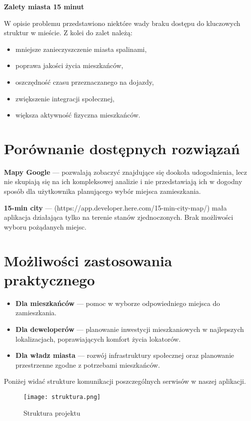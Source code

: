 \documentclass{article}
\begin{document}
\noindent
\textbf{Zalety miasta 15 minut}

W opisie problemu przedstawiono niektóre wady braku dostępu do kluczowych struktur w mieście. Z kolei do zalet należą:

\begin{itemize}
    \item mniejsze zanieczyszczenie miasta spalinami,
    \item poprawa jakości życia mieszkańców,
    \item oszczędność czasu przeznaczanego na dojazdy,
    \item zwiększenie integracji społecznej,
    \item większa aktywność fizyczna mieszkańców.
\end{itemize}

\section{Porównanie dostępnych rozwiązań}

\textbf{Mapy Google} — pozwalają zobaczyć znajdujące się dookoła udogodnienia, lecz nie skupiają się na ich kompleksowej analizie i nie przedstawiają ich w dogodny sposób dla użytkownika planującego wybór miejsca zamieszkania.

\textbf{15-min city} — (https://app.developer.here.com/15-min-city-map/) mała aplikacja działająca tylko na terenie stanów zjednoczonych. Brak możliwości wyboru pożądanych miejsc.

\section{Możliwości zastosowania praktycznego}

\begin{itemize}
    \item \textbf{Dla mieszkańców} — pomoc w wyborze odpowiedniego miejsca do zamieszkania.
    \item \textbf{Dla deweloperów} — planowanie inwestycji mieszkaniowych w najlepszych lokalizacjach, poprawiających komfort życia lokatorów.
    \item \textbf{Dla władz miasta} — rozwój infrastruktury społecznej oraz planowanie przestrzenne zgodne z potrzebami mieszkańców.
\end{itemize}


Poniżej widać strukture komunikacji poszczególnych serwisów w naszej aplikacji.

\begin{figure}[H]
    \centering
    \texttt{[image: struktura.png]}
    \caption{Struktura projektu}
    \label{fig:struktura}
\end{figure}
\end{document}
